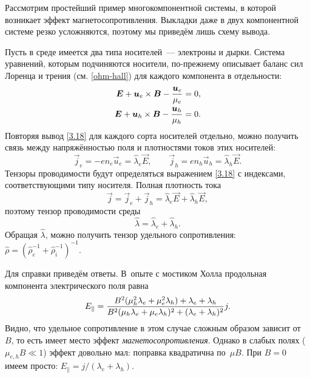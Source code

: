\begin{lab:example}
Рассмотрим простейший пример многокомпонентной системы, в которой возникает
эффект магнетосопротивления. Выкладки даже в двух компонентной
системе резко усложняются, поэтому мы приведём лишь схему вывода.

Пусть в среде имеется два типа носителей~--- электроны и дырки. Система
уравнений, которым подчиняются носители, по-прежнему описывает баланс
сил Лоренца и трения (см. \eqref{ohm-hall}) для каждого компонента в
отдельности:
\begin{equation}
    \eqmark{two-component}
    \begin{aligned}
\vec{E}+\vec{u}_e\times \vec{B} - \frac{\vec{u}_e}{\mu_e} &=0,\\
\vec{E}+\vec{u}_h\times \vec{B} - \frac{\vec{u}_h}{\mu_h} &=0.
\end{aligned}
\end{equation}
Повторяя вывод \eqref{3.18} для каждого сорта носителей отдельно, можно
получить связь между напряжённостью поля и плотностями токов этих носителей:
\begin{equation}
    \vec{j}_e = -en_e \vec{u}_e = \hat{\lambda}_e \vec{E},\qquad
    \vec{j}_h = en_h \vec{u}_h = \hat{\lambda}_h \vec{E}.
\end{equation}
Тензоры проводимости будут определяться выражением \eqref{3.18} с индексами,
соответствующими типу носителя.
Полная плотность тока
\[
\vec{j} = \vec{j}_e + \vec{j}_h = \hat{\lambda}_e \vec{E} +
\hat{\lambda}_h \vec{E},
\]
поэтому тензор проводимости среды
\[
\hat{\lambda} = \hat{\lambda}_e + \hat{\lambda}_h.
\]
Обращая $\hat{\lambda}$, можно получить тензор удельного сопротивления:
$\hat{\rho}=
\left(\hat{\rho}_e^{-1}+\hat{\rho}_i^{-1}\right)^{-1}$.

Для справки приведём ответы.
В~опыте с мостиком Холла продольная компонента электрического поля равна
\begin{equation}
\eqmark{lambda_twocomponent}
E_{\parallel} = \frac{B^2 (\mu_h^2 \lambda_e + \mu_e^2 \lambda_h) + \lambda_e+
    \lambda_h}%
{ B^2 (\mu_h \lambda_e + \mu_e \lambda_h)^2 + (\lambda_e+\lambda_h)^2}
j.
\end{equation}
Видно, что удельное сопротивление в этом случае сложным образом
зависит от~$B$, то есть имеет место эффект \emph{магнетосопротивления}.
Однако в слабых полях ($\mu_{e,h}B \ll 1$) эффект довольно мал: поправка
квадратична по~$\mu B$. При $B=0$ имеем просто:
$E_{\parallel} = j/(\lambda_e+\lambda_h)$.


\end{lab:example}
